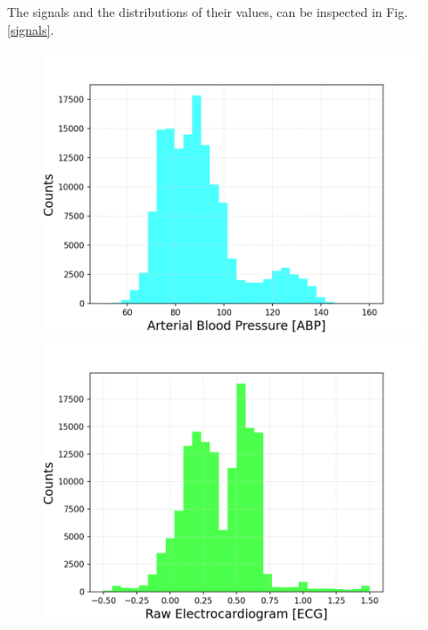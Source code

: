 \documentclass{article}
\begin{document}
The signals and the distributions of their values, can be inspected in Fig. \ref{signals}.


\begin{figure}[h!]
	\centering
	\begin{minipage}[b]{0.32\textwidth}
		\includegraphics[width=\textwidth]{plots/histo_ABP.png}

	\end{minipage}
	\begin{minipage}[b]{0.32\textwidth}
		\includegraphics[width=\textwidth]{plots/histo_ECG.png}


\end{minipage}
\end{figure}
\end{document}
